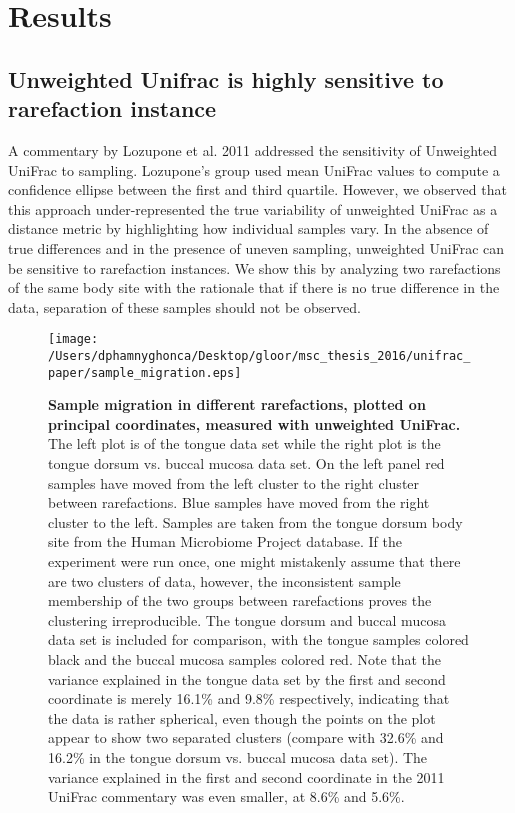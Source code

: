\documentclass[10pt,letterpaper]{article}
\begin{document}
\section*{Results}

\subsection{Unweighted Unifrac is highly sensitive to rarefaction instance}

A commentary by Lozupone et al. 2011 \cite{lozupone2011unifrac} addressed the sensitivity of Unweighted UniFrac to sampling. Lozupone's group used mean UniFrac values to compute a confidence ellipse between the first and third quartile. However, we observed that this approach under-represented the true variability of unweighted UniFrac as a distance metric by highlighting how individual samples vary. In the absence of true differences and in the presence of uneven sampling, unweighted UniFrac can be sensitive to rarefaction instances. We show this by analyzing two rarefactions of the same body site with the rationale that if there is no true difference in the data, separation of these samples should not be observed.

\begin{figure}[h]
\texttt{[image: /Users/dphamnyghonca/Desktop/gloor/msc\_thesis\_2016/unifrac\_paper/sample\_migration.eps]}
\caption[Sample migration in different rarefactions, plotted on principal coordinates, measured with unweighted UniFrac.]{{\bf Sample migration in different rarefactions, plotted on principal coordinates, measured with unweighted UniFrac.}
The left plot is of the tongue data set while the right plot is the tongue dorsum vs. buccal mucosa data set. On the left panel red samples have moved from the left cluster to the right cluster between rarefactions. Blue samples have moved from the right cluster to the left. Samples are taken from the tongue dorsum body site from the Human Microbiome Project database. If the experiment were run once, one might mistakenly assume that there are two clusters of data, however, the inconsistent sample membership of the two groups between rarefactions proves the clustering irreproducible. The tongue dorsum and buccal mucosa data set is included for comparison, with the tongue samples colored black and the buccal mucosa samples colored red. Note that the variance explained in the tongue data set by the first and second coordinate is merely 16.1\% and 9.8\% respectively, indicating that the data is rather spherical, even though the points on the plot appear to show two separated clusters (compare with 32.6\% and 16.2\% in the tongue dorsum vs. buccal mucosa data set). The variance explained in the first and second coordinate in the 2011 UniFrac commentary \cite{lozupone2011unifrac} was even smaller, at 8.6\% and 5.6\%.}
\label{fig2}
\end{figure}
\end{document}

